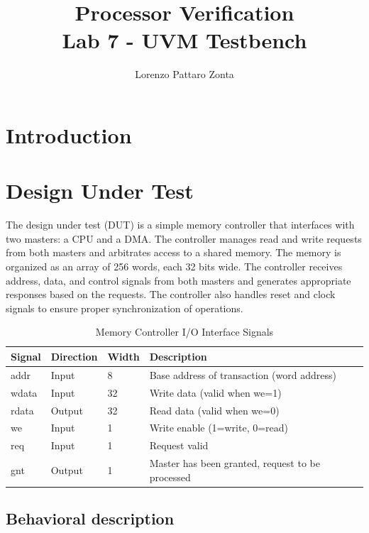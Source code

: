 \documentclass{article}
\title{Processor Verification \\Lab 7 - UVM Testbench}
\author{Lorenzo Pattaro Zonta}
\begin{document}
\maketitle

\section{Introduction}

\section{Design Under Test}
The design under test (DUT) is a simple memory controller that interfaces with two masters: a CPU and a DMA. The controller manages read and write requests from both masters and arbitrates access to a shared memory. The memory is organized as an array of 256 words, each 32 bits wide. The controller receives address, data, and control signals from both masters and generates appropriate responses based on the requests. The controller also handles reset and clock signals to ensure proper synchronization of operations.

\begin{table}[H]
\centering
    \begin{tabular}{|l|l|l|p{8cm}|}
      \hline
      \textbf{Signal} & \textbf{Direction} & \textbf{Width} & \textbf{Description} \\
      \hline
      addr & Input & 8 & Base address of transaction (word address) \\
      \hline
      wdata & Input & 32 & Write data (valid when we=1) \\
      \hline
      rdata & Output & 32 & Read data (valid when we=0) \\
      \hline
      we & Input & 1 & Write enable (1=write, 0=read) \\
      \hline
      req & Input & 1 & Request valid \\
      \hline
      gnt & Output & 1 & Master has been granted, request to be processed \\
      \hline
    \end{tabular}
    \caption{Memory Controller I/O Interface Signals}
\end{table}

\subsection{Behavioral description}
\end{document}
